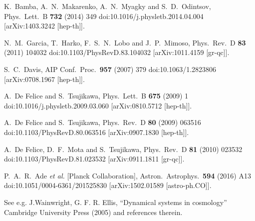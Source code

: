 \documentclass[a4paper,aps,onecolumn,nofootinbib]{revtex4}
\begin{document}
\begin{thebibliography}{999}
  K.~Bamba, A.~N.~Makarenko, A.~N.~Myagky and S.~D.~Odintsov,
  Phys.\ Lett.\ B {\bf 732} (2014) 349
  doi:10.1016/j.physletb.2014.04.004
  [arXiv:1403.3242 [hep-th]].
  
  N.~M.~Garcia, T.~Harko, F.~S.~N.~Lobo and J.~P.~Mimoso,
  Phys.\ Rev.\ D {\bf 83} (2011) 104032
  doi:10.1103/PhysRevD.83.104032
  [arXiv:1011.4159 [gr-qc]].
  
  S.~C.~Davis,
  AIP Conf.\ Proc.\  {\bf 957} (2007) 379
  doi:10.1063/1.2823806
  [arXiv:0708.1967 [hep-th]].
  
  A.~De Felice and S.~Tsujikawa,
  Phys.\ Lett.\ B {\bf 675} (2009) 1
  doi:10.1016/j.physletb.2009.03.060
  [arXiv:0810.5712 [hep-th]].
  
  A.~De Felice and S.~Tsujikawa,
  Phys.\ Rev.\ D {\bf 80} (2009) 063516
  doi:10.1103/PhysRevD.80.063516
  [arXiv:0907.1830 [hep-th]]. 
  
  A.~De Felice, D.~F.~Mota and S.~Tsujikawa,
  Phys.\ Rev.\ D {\bf 81} (2010) 023532
  doi:10.1103/PhysRevD.81.023532
  [arXiv:0911.1811 [gr-qc]].
  
  P.~A.~R.~Ade {\it et al.} [Planck Collaboration],
  Astron.\ Astrophys.\  {\bf 594} (2016) A13
  doi:10.1051/0004-6361/201525830
  [arXiv:1502.01589 [astro-ph.CO]].
  
    See e.g. J.Wainwright, G. F. R. Ellis,  ``Dynamical systems in cosmology'' Cambridge University Press (2005) and references therein.
  

\end{thebibliography}
\end{document}
